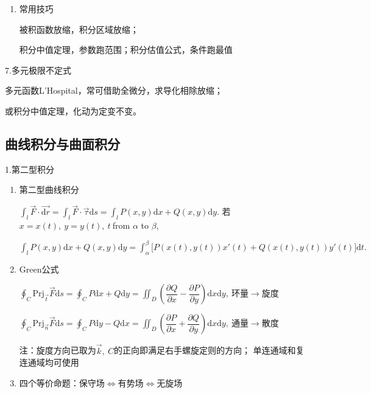 \documentclass[UTF8]{ctexart}
\numberwithin{equation}{section}
\numberwithin{figure}{section}
\numberwithin{table}{section}
\newcommand\dif{\mathrm{d}}
\newcommand\no{\noindent}
\newcommand\dis{\displaystyle}
\newcommand\intd{\dis\int}
\begin{document}
\begin{spacing}{2}
\begin{enumerate}[itemindent=1.4em, label=(\arabic*)]
\item 常用技巧

被积函数放缩，积分区域放缩；

积分中值定理，参数跑范围；积分估值公式，条件跑最值

\end{enumerate}

\no7.多元极限不定式

多元函数L'Hospital，常可借助全微分，求导化相除放缩；

或积分中值定理，化动为定变不变。

\subsection{曲线积分与曲面积分}

\no1.第二型积分

\begin{enumerate}[itemindent=1.4em, label=(\arabic*)]

\item 第二型曲线积分

$\intd_l\stackrel{\rightarrow}{F}\cdot \stackrel{\longrightarrow}{\dif r}=
\intd_l\stackrel{\rightarrow}{F}\cdot\stackrel{\rightarrow}{\tau}\dif s=
\intd_lP(x,y)\dif x+Q(x,y)\dif y.$
若$x=x(t),\ y=y(t),\ t \ $from $\alpha$ to $\beta$, 

$\intd_lP(x,y)\dif x+Q(x,y)\dif y
=\intd_\alpha^\beta\big[P(x(t),y(t))x'(t)+Q(x(t),y(t))y'(t)\big]\dif t.$

\item \textcolor[rgb]{1,0,0}{Green公式}

$\dis\oint_C\text{Prj}_{\stackrel{\rightarrow}{t}}\stackrel{\rightarrow}{F}\dif s
=\oint_CP\dif x+Q\dif y=
\iint_D\left(\dfrac{\partial Q}{\partial x}-\dfrac{\partial P}{\partial y}\right)\dif x\dif y,
\ $环量$\longrightarrow$旋度

$\dis\oint_C\text{Prj}_{\stackrel{\rightarrow}{n}}\stackrel{\rightarrow}{F}\dif s
=\oint_CP\dif y-Q\dif x=
\iint_D\left(\dfrac{\partial P}{\partial x}+\dfrac{\partial Q}{\partial y}\right)\dif x\dif y,
\ $通量$\longrightarrow$散度

注：旋度方向已取为$\stackrel{\rightarrow}{k},\ C$的正向即满足右手螺旋定则的方向；
单连通域和复连通域均可使用

\item 四个等价命题：保守场$\Longleftrightarrow$有势场$\Longleftrightarrow$无旋场

\begin{enumerate}[itemindent=1.4em, label=(\alph*)]


\end{enumerate}
\end{enumerate}
\end{spacing}
\end{document}
